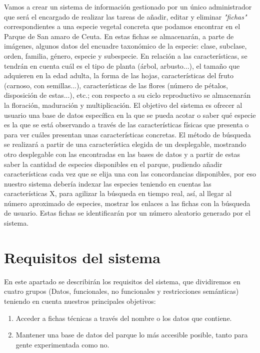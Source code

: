 \documentclass[10pt,a4paper]{article}
\begin{document}
Vamos a crear un sistema de información gestionado por un único administrador que será el encargado de realizar las tareas de añadir, editar y eliminar \textit{"fichas"} correspondientes a una especie vegetal concreta que podamos encontrar en el Parque de San amaro de Ceuta. En estas fichas se almacenarán, a parte de imágenes, algunos datos  del encuadre taxonómico de la especie: clase, subclase, orden, familia, género, especie y subespecie.  En relación a las características, se tendrán en cuenta cuál es el tipo de planta (árbol, arbusto...), el tamaño que adquieren en la edad adulta,  la forma de las hojas, características del fruto (carnoso, con semillas...), características de las flores (número de pétalos, disposición de estas...), etc.; con respecto a su ciclo reproductivo se almacenarán la floración, maduración y multiplicación. El objetivo del sistema es ofrecer al usuario una base de datos específica en la que se pueda acotar o saber qué especie es la que se está observando a través de las características físicas que presenta o para ver cuáles presentan unas características concretas. El método de búsqueda se realizará a partir de una característica elegida de un desplegable, mostrando otro desplegable con las encontradas en las bases de datos y a partir de estas saber la cantidad de especies disponibles en el parque, pudiendo añadir características cada vez que se elija una con las concordancias disponibles, por eso nuestro sistema debería indexar las especies teniendo en cuentas las características X, para agilizar la búsqueda en tiempo real, así, al llegar al número aproximado de especies, mostrar los enlaces a las fichas con la búsqueda de usuario. Estas fichas se identificarán por un número aleatorio generado por el sistema.

\section{\textbf{Requisitos del sistema}}

En este apartado se describirán los requisitos del sistema, que dividiremos en cuatro grupos (Datos, funcionales, no funcionales y restricciones semánticas) teniendo en cuenta nuestros principales objetivos:

\begin{enumerate}
\item Acceder a fichas técnicas a través del nombre o los datos que contiene.
\item Mantener una base de datos del parque lo más accesible posible, tanto para gente experimentada como no.
\end{enumerate}
\end{document}
